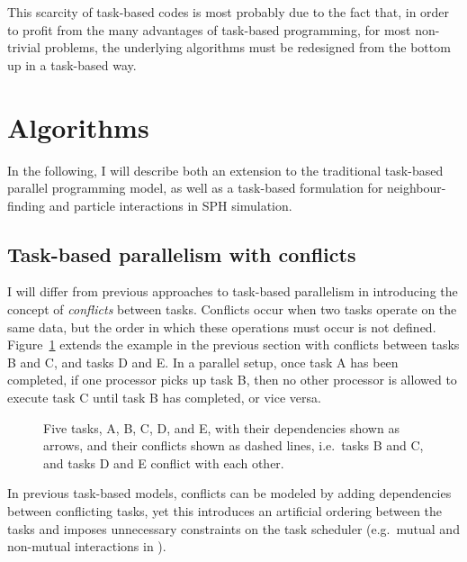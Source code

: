 \documentclass[final]{siamltex}
\newcommand{\fig}[1]
    {Figure~\ref{fig:#1}}
\begin{document}
This scarcity of task-based codes is most probably due to the fact that,
in order to profit from the many advantages of task-based programming,
for most non-trivial problems, the underlying algorithms must
be redesigned from the bottom up in a task-based way.


\section{Algorithms}

In the following, I will describe both an extension to the
traditional task-based parallel programming model, as well
as a task-based formulation for neighbour-finding and 
particle interactions in SPH simulation.


\subsection{Task-based parallelism with conflicts}

I will differ from previous approaches to task-based parallelism
in introducing the concept of {\em conflicts} between tasks.
Conflicts occur when two tasks operate on the same data, 
but the order in which these operations must occur is not defined.
\fig{TasksExampleConflicts} extends the example in the
previous section with conflicts between tasks B and C, and tasks D and E.
In a parallel setup, once task A has been completed, if one processor
picks up task B, then no other processor is allowed to execute
task C until task B has completed, or vice versa.

\begin{figure}
    \centerline{}
    
    \caption{Five tasks, A, B, C, D, and E, with their dependencies
        shown as arrows, and their conflicts shown as dashed lines,
        i.e.~tasks B and C, and tasks D and E conflict with each
        other.}
    \label{fig:TasksExampleConflicts}
\end{figure}

In previous task-based models, conflicts can be modeled by adding
dependencies between conflicting tasks,
yet this introduces an artificial ordering between the tasks
and imposes unnecessary constraints on the task scheduler
(e.g.~mutual and non-mutual interactions in \cite{ref:Ltaief2012}).
\end{document}
